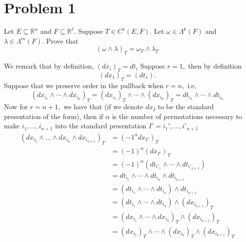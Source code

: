 \documentclass[11pt]{article}
\newcommand{\bbR}{\mathbb{R}}
\begin{document}
	
	
	\psetheader
    
    
    \section*{Problem 1}
Let $E\subseteq\bbR^n$ and $F \subseteq \bbR^\ell.$ Suppose $T \in C^1(E,F).$ Let $\omega \in \Lambda^k(F)$ and $\lambda \in \Lambda^m(F).$ Prove that 
\[(\omega \wedge \lambda)_T = \omega_T \wedge \lambda_T\]
\begin{solution}
We remark that by definition, $(dx_{i})_T = dt_i$
    Suppose $r = 1,$ then by definition 
    \[(dx_1)_T = (dt_1).\]
    Suppose that we preserve order in the pullback when $r = n,$ i.e,
    \[(dx_{i_1} \wedge \cdots \wedge dx_{i_n})_T  = (dx_{i_1})_T \wedge \cdots \wedge (dx_{i_n})_T  = dt_{i_1}\wedge \cdots \wedge dt_{i_n}\]
    Now for $r = n+1,$ we have that (if we denote $dx_I$ to be the standard presentation of the form), then if $\alpha$ is the number of permutations necessary to make $i_1, \dots, i_{n+1}$ into the standard presentation $I'= i_{1}', \dots, i'_{n+1}$
    \begin{align*}
        (dx_{i_1}\wedge \dots \wedge dx_{i_n} \wedge dx_{i_{n+1}})_T &= (-1^\alpha dx_{I'})_T\\
        &= (-1)^\alpha (dx_{I'})_T\\
        &= (-1)^\alpha \left(dt_{i'_1} \wedge \cdots \wedge dt_{i'_{n+1}}\right)\\
        &= dt_{i_1} \wedge \cdots \wedge dt_{i_n} \wedge dt_{i_{n+1}}\\
        &= (dt_{i_1} \wedge \cdots \wedge dt_{i_n}) \wedge dt_{i_{n+1}}\\
        &= (dt_{i_1} \wedge \cdots \wedge dt_{i_n}) \wedge (dx_{i_{n+1}})_T\\
        &= (dx_{i_1} \wedge \cdots \wedge dx_{i_n})_T \wedge (dx_{i_{n+1}})_T\\
        &= (dx_{i_1})_T \wedge \cdots \wedge (dx_{i_n})_T\wedge (dx_{i_{n+1}})_T\\
    \end{align*}


\end{solution}
\end{document}
